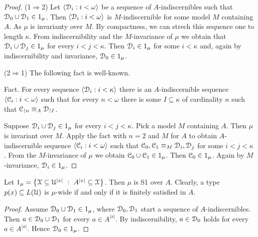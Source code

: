 \documentclass{amsproc}
\begin{document}
\begin{proof}
  (1$\Rightarrow$2)  Let $\langle\EuScript D_i:i<\omega\rangle$ be a sequence of $A$-indiscernibles such that $\EuScript D_0\cup\EuScript D_1\in1_\mu$.
  Then $\langle\EuScript D_i:i<\omega\rangle$ is $M$-indiscernible for some model $M$ containing $A$.
  As $\mu$ is invarianty over $M$. 
  By compactness, we can strech this sequence one to length $\kappa$.
  From indiscernibility and the $M$-invariance of $\mu$ we obtain that $\EuScript D_i\cup\EuScript D_j\in1_\mu$ for every $i<j<\kappa$.
  Then $\EuScript D_i\in1_\mu$ for some $i<\kappa$ and, again by indiscernibility and invariance, $\EuScript D_0\in1_\mu$.

  (2$\Rightarrow$1)
  The following fact is well-known.
  
  Fact.
  For every sequence $\langle\EuScript D_i:i<\kappa\rangle$ there is an $A$-indiscernible sequence $\langle\EuScript C_i:i<\omega\rangle$ such that for every $n<\omega$ there is some $I\subseteq\kappa$ of cardinality $n$ such that $\EuScript C_{\restriction n}\equiv_A\EuScript D_{\restriction I}$.

  Suppose $\EuScript D_i\cup \EuScript D_j\in1_\mu$ for every $i<j<\kappa$.
  Pick a model $M$ containing $A$.
  Then $\mu$ is invariant over $M$.
  Apply the fact with $n=2$ and $M$ for $A$ to obtain $A$-indiscer\-nible sequence $\langle\EuScript C_i:i<\omega\rangle$ such that $\EuScript C_0,\EuScript C_1\equiv_M\EuScript D_i,\EuScript D_j$ for some $i<j<\kappa$.
  From the $M$-invariance of $\mu$ we obtain $\EuScript C_0\cup \EuScript C_1\in1_\mu$.
  Then $\EuScript C_0\in1_\mu$.
  Again by $M$-invariance, $\EuScript D_i\in1_\mu$.
\end{proof}

\begin{example}\label{ex_mu_fin_sat}
  Let $1_\mu=\big\{\EuScript X\subseteq\EuScript U^{|x|}\ :\ A^{|x|}\subseteq\EuScript X\big\}$.
  Then $\mu$ is S1 over $A$.
  Clearly, a type $p(x)\subseteq L(\EuScript U)$ is $\mu$-wide if and only if it is finitely satisfied in $A$.
\end{example}

\begin{proof} 
  Assume $\EuScript D_0\cup\EuScript D_1\in1_\mu$, where $\EuScript D_0,\EuScript D_1$ start a sequence of $A$-indiscernibles.
  Then $a\in\EuScript D_0\cup\EuScript D_1$ for every $a\in A^{|x|}$.
  By indiscernibility, $a\in\EuScript D_0$ holds for every $a\in A^{|x|}$.
  Hence $\EuScript D_0\in1_\mu$.
\end{proof}
\end{document}

